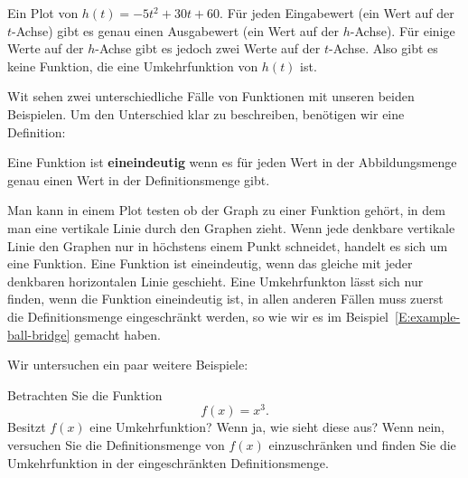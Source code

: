 \begin{marginfigure}[-5in]
\caption{
Ein Plot von $h(t)=-5t^2+30t+60$. Für jeden Eingabewert (ein Wert auf der $t$-Achse) gibt es genau einen Ausgabewert (ein Wert auf der $h$-Achse). Für einige Werte auf der $h$-Achse gibt es jedoch zwei Werte auf der $t$-Achse. Also gibt es keine Funktion, die eine Umkehrfunktion von $h(t)$ ist.}
\label{plot:fxn ball}
\end{marginfigure}

Wit sehen zwei unterschiedliche Fälle von Funktionen mit unseren beiden Beispielen. Um den Unterschied klar zu beschreiben, benötigen wir eine Definition:

\begin{definition}
Eine Funktion ist \textbf{eineindeutig} wenn es für jeden Wert in der Abbildungsmenge genau einen Wert in der Definitionsmenge gibt.
\end{definition}

Man kann in einem Plot testen ob der Graph zu einer Funktion gehört, in dem man eine vertikale Linie durch den Graphen zieht. Wenn jede denkbare vertikale Linie den Graphen nur in höchstens einem Punkt schneidet, handelt es sich um eine Funktion. Eine Funktion ist eineindeutig, wenn das gleiche mit jeder denkbaren horizontalen Linie geschieht. Eine Umkehrfunkton lässt sich nur finden, wenn die Funktion eineindeutig ist, in allen anderen Fällen muss zuerst die Definitionsmenge eingeschränkt werden, so wie wir es im Beispiel~\ref{E:example-ball-bridge} gemacht haben.


Wir untersuchen ein paar weitere Beispiele:



\begin{example}
Betrachten Sie die Funktion
\[
f(x) = x^3.
\]
Besitzt $f(x)$ eine Umkehrfunktion? Wenn ja, wie sieht diese aus? Wenn nein, versuchen Sie die Definitionsmenge von $f(x)$ einzuschränken und finden Sie die Umkehrfunktion in der eingeschränkten Definitionsmenge.
\end{example}


